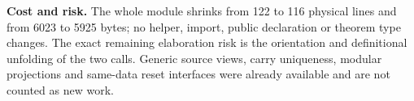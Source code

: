\textbf{Cost and risk.} The whole module shrinks from 122 to 116 physical lines and from 6023 to 5925 bytes; no helper, import, public declaration or theorem type changes. The exact remaining elaboration risk is the orientation and definitional unfolding of the two  calls. Generic source views, carry uniqueness, modular projections and same-data reset interfaces were already available and are not counted as new work.
